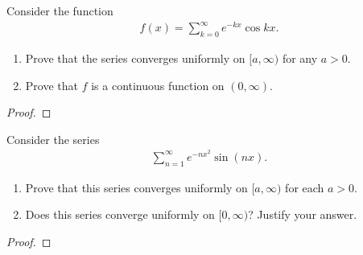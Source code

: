\documentclass[11pt,twoside,openany]{memoir}
\begin{document}
\newpage
\fancyhead[L]{\scalebox{0.9}{Series of Functions}}
\fancyhead[R]{\scalebox{0.9}{Appeared on: F18}}
\begin{problem}
    Consider the function
        \begin{equation*}
        \begin{split}
            f(x) = \sum_{k = 0}^\infty e^{-kx}\cos kx.
        \end{split}
        \end{equation*}
    \begin{enumerate}[label = (\arabic*)]
        \item Prove that the series converges uniformly on $[a,\infty)$ for any $a > 0$.
        \item Prove that $f$ is a continuous function on $(0,\infty)$.
    \end{enumerate}
\end{problem}
\begin{proof}
\end{proof}

\newpage
\fancyhead[L]{\scalebox{0.9}{Series of Functions}}
\fancyhead[R]{\scalebox{0.9}{Appeared on: F17}}
\begin{problem}
    Consider the series
        \begin{equation*}
        \begin{split}
            \sum_{n = 1}^\infty e^{-n{x^2}}\sin(nx).
        \end{split}
        \end{equation*}
    \begin{enumerate}[label = (\arabic*)]
        \item Prove that this series converges uniformly on $[a,\infty)$ for each $a > 0$.
        \item Does this series converge uniformly on $[0,\infty)$? Justify your answer.
    \end{enumerate}
\end{problem}
\begin{proof}
\end{proof}
\end{document}

